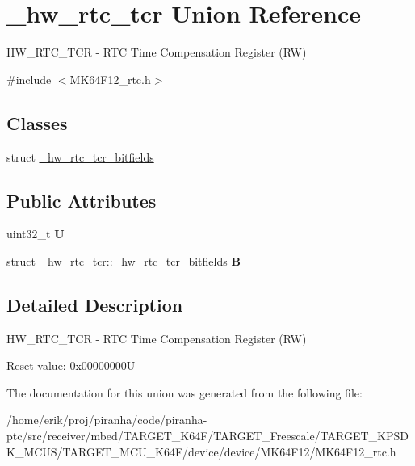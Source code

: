\hypertarget{union__hw__rtc__tcr}{}\section{\+\_\+hw\+\_\+rtc\+\_\+tcr Union Reference}
\label{union__hw__rtc__tcr}


H\+W\+\_\+\+R\+T\+C\+\_\+\+T\+CR -\/ R\+TC Time Compensation Register (RW)  




{\ttfamily \#include $<$M\+K64\+F12\+\_\+rtc.\+h$>$}

\subsection*{Classes}
\begin{DoxyCompactItemize}
\item 
struct \hyperlink{struct__hw__rtc__tcr_1_1__hw__rtc__tcr__bitfields}{\+\_\+hw\+\_\+rtc\+\_\+tcr\+\_\+bitfields}
\end{DoxyCompactItemize}
\subsection*{Public Attributes}
\begin{DoxyCompactItemize}
\item 
uint32\+\_\+t {\bfseries U}\hypertarget{union__hw__rtc__tcr_a41368e7bfbf353eb1fe9bd42b24792e5}{}\label{union__hw__rtc__tcr_a41368e7bfbf353eb1fe9bd42b24792e5}

\item 
struct \hyperlink{struct__hw__rtc__tcr_1_1__hw__rtc__tcr__bitfields}{\+\_\+hw\+\_\+rtc\+\_\+tcr\+::\+\_\+hw\+\_\+rtc\+\_\+tcr\+\_\+bitfields} {\bfseries B}\hypertarget{union__hw__rtc__tcr_a6eb2a113dc0dd754fad602965a8d76ca}{}\label{union__hw__rtc__tcr_a6eb2a113dc0dd754fad602965a8d76ca}

\end{DoxyCompactItemize}


\subsection{Detailed Description}
H\+W\+\_\+\+R\+T\+C\+\_\+\+T\+CR -\/ R\+TC Time Compensation Register (RW) 

Reset value\+: 0x00000000U 

The documentation for this union was generated from the following file\+:\begin{DoxyCompactItemize}
\item 
/home/erik/proj/piranha/code/piranha-\/ptc/src/receiver/mbed/\+T\+A\+R\+G\+E\+T\+\_\+\+K64\+F/\+T\+A\+R\+G\+E\+T\+\_\+\+Freescale/\+T\+A\+R\+G\+E\+T\+\_\+\+K\+P\+S\+D\+K\+\_\+\+M\+C\+U\+S/\+T\+A\+R\+G\+E\+T\+\_\+\+M\+C\+U\+\_\+\+K64\+F/device/device/\+M\+K64\+F12/M\+K64\+F12\+\_\+rtc.\+h\end{DoxyCompactItemize}
